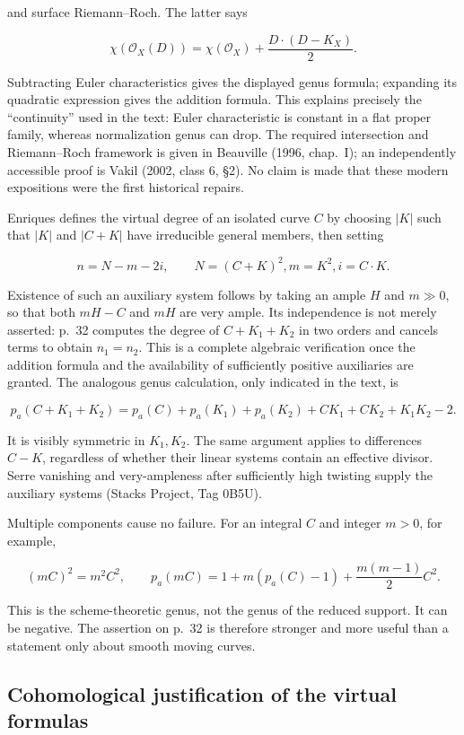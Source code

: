 and surface Riemann--Roch. The latter says

\[
\chi(\mathcal O_X(D))=\chi(\mathcal O_X)
+\frac{D\cdot(D-K_X)}2.
\]

Subtracting Euler characteristics gives the displayed genus formula; expanding its quadratic expression gives the addition formula. This explains precisely the ``continuity'' used in the text: Euler characteristic is constant in a flat proper family, whereas normalization genus can drop. The required intersection and Riemann--Roch framework is given in Beauville (1996, chap.~I); an independently accessible proof is Vakil (2002, class 6, §2). No claim is made that these modern expositions were the first historical repairs.

Enriques defines the virtual degree of an isolated curve \(C\) by choosing \(|K|\) such that \(|K|\) and \(|C+K|\) have irreducible general members, then setting

\[
n=N-m-2i,\qquad N=(C+K)^2, m=K^2, i=C\cdot K.
\]

Existence of such an auxiliary system follows by taking an ample \(H\) and \(m\gg0\), so that both \(mH-C\) and \(mH\) are very ample. Its independence is not merely asserted: p.~32 computes the degree of \(C+K_1+K_2\) in two orders and cancels terms to obtain \(n_1=n_2\). This is a complete algebraic verification once the addition formula and the availability of sufficiently positive auxiliaries are granted. The analogous genus calculation, only indicated in the text, is

\[
p_a(C+K_1+K_2)
=p_a(C)+p_a(K_1)+p_a(K_2)
+C K_1+C K_2+K_1K_2-2.
\]

It is visibly symmetric in \(K_1,K_2\). The same argument applies to differences \(C-K\), regardless of whether their linear systems contain an effective divisor. Serre vanishing and very-ampleness after sufficiently high twisting supply the auxiliary systems (Stacks Project, Tag 0B5U).

Multiple components cause no failure. For an integral \(C\) and integer \(m>0\), for example,

\[
(mC)^2=m^2C^2,\qquad
p_a(mC)=1+m(p_a(C)-1)+\frac{m(m-1)}2C^2.
\]

This is the scheme-theoretic genus, not the genus of the reduced support. It can be negative. The assertion on p.~32 is therefore stronger and more useful than a statement only about smooth moving curves.

\subsection{Cohomological justification of the virtual formulas}

